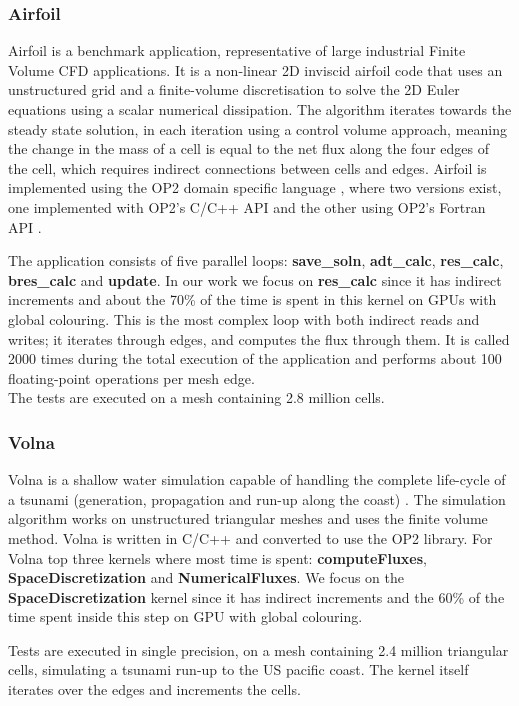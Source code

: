 \subsubsection{Airfoil}
Airfoil is a benchmark application, representative of
large industrial Finite Volume CFD applications. It is a non-linear 2D inviscid
airfoil code that uses an unstructured grid and a finite-volume discretisation
to solve the 2D Euler equations using a scalar numerical dissipation. The
algorithm iterates towards the steady state solution, in each iteration using a
control volume approach, meaning the change in the mass of a cell is equal to
the net flux along the four edges of the cell, which requires indirect
connections between cells and edges. Airfoil is implemented using the OP2 domain
specific language \cite{op2}, where two versions exist, one implemented with
OP2's C/C++ API and the other using OP2's Fortran API
\cite{giles2012op2,op2-repo}.

The application consists of five parallel loops: \textbf{save\_soln},
\textbf{adt\_calc}, \textbf{res\_calc}, \textbf{bres\_calc} and \textbf{update}.
In our work we focus on \textbf{res\_calc} since it has indirect increments and
about the 70\% of the time is spent in this kernel on GPUs with global
colouring.  This is the most complex loop with both indirect reads and writes; it
iterates through edges, and computes the flux through them. It is called 2000
times during the total execution of the application and performs about 100
floating-point operations per mesh edge.
\\
 The tests are executed on a mesh containing 2.8 million cells.

\subsubsection{Volna}
Volna is a shallow water simulation capable of handling the complete life-cycle
of a tsunami (generation, propagation and run-up along the coast)
\cite{dutykh2011volna}. The simulation algorithm works on unstructured
triangular meshes and uses the finite volume method. Volna is written in C/C++
and converted to use the OP2 library\cite{op2}. For Volna top three kernels
where most time is spent: \textbf{computeFluxes}, \textbf{SpaceDiscretization}
and \textbf{NumericalFluxes}. We focus on the \textbf{SpaceDiscretization}
kernel since it has indirect increments and the 60\% of the time spent inside
this step on GPU with global colouring. 

Tests are executed in single precision, on a mesh containing 2.4 million
triangular cells, simulating a tsunami run-up to the US pacific coast. The
kernel itself iterates over the edges and increments the cells.

